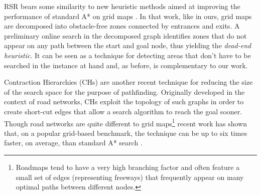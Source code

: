 \par
RSR bears some similarity to new heuristic methods aimed at improving the 
performance of standard A* on grid maps \cite{bjornsson06}.
In that work, like in ours, grid maps are decomposed into obstacle-free zones connected by entrances 
and exits.
A preliminary online search in the decomposed graph identifies zones that do not appear 
on any path between the start and goal node, thus yielding the \emph{dead-end heuristic}.
It can be seen as a technique for detecting areas that don't have to be searched
in the instance at hand and, as before, is complementary to our work.
\par
Contraction Hierarchies (CHs) \cite{geisberger08} are another recent technique 
for reducing the size of the search space for the purpose of pathfinding.
Originally developed in the context of road networks, CHs exploit the topology 
of such graphs in order to create short-cut edges that allow a search algorithm to 
reach the goal sooner.
Though road networks are quite different to grid maps\footnote{Roadmaps tend to
have a very high branching factor and often feature a small set of edges (representing freeways) 
that frequently appear on many optimal paths between different nodes.} recent work has 
shown that, on a popular grid-based benchmark, the technique can be up to six times faster, on average, 
than standard A* search \cite{sturtevant10}.


